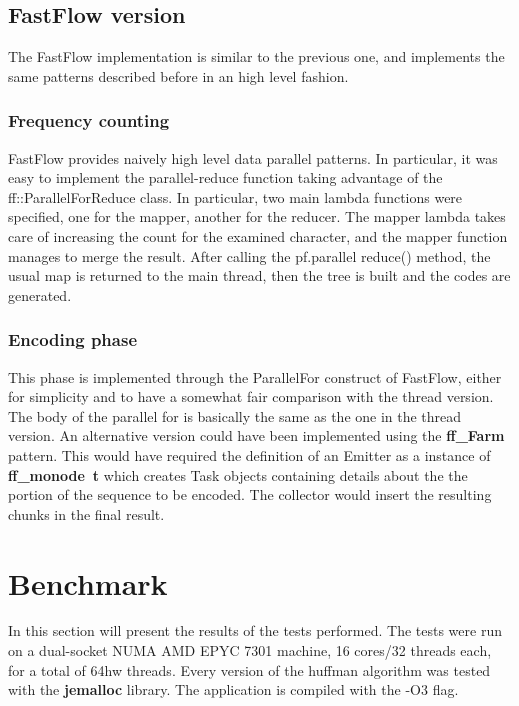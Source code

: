 \documentclass{article}
\begin{document}
\subsection{FastFlow version}
The FastFlow implementation is similar to the previous one, and
implements the same patterns described before in an high level fashion.
\subsubsection{Frequency counting}
FastFlow provides naively high level data parallel patterns. In particular, it was easy
to implement the parallel-reduce function taking advantage of the ff::ParallelForReduce
class. In particular, two main lambda functions were specified, one for the mapper,
another for the reducer. The mapper lambda takes care of increasing the count
for the examined character, and the mapper function manages to merge the result.
After calling the pf.parallel reduce() method, the usual map is returned to the
main thread, then the tree is built and the codes are generated.
\subsubsection{Encoding phase}
This phase is implemented through the ParallelFor construct of FastFlow,
either for simplicity and to have a somewhat fair comparison with the thread version.
The body of the parallel for is basically the same as the one in the thread version.
An alternative version could have been implemented using the \textbf{ff\_Farm} pattern.
This would have required the definition of an Emitter as a instance of
\textbf{ff\_monode\ t} which creates Task objects containing details about the
the portion of the sequence to be encoded. The collector would insert the
resulting chunks in the final result.


\section{Benchmark}
In this section will present the results of the tests performed.
The tests were run on a dual-socket
NUMA AMD EPYC 7301 machine, 16 cores/32 threads each, for a total of 64hw
threads.
Every version of the huffman algorithm was tested with the \textbf{jemalloc} library.
The application is compiled with the -O3 flag.
\end{document}
